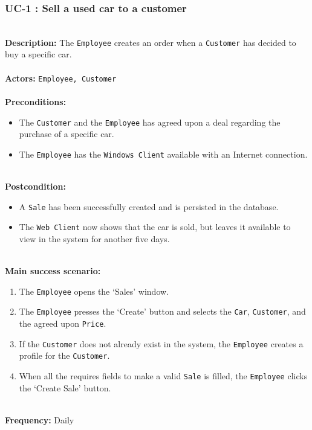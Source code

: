\subsubsection{UC-1 : Sell a used car to a customer}
\label{create-order-use-case}
\HRule \\[0.4cm]
\textbf{Description:} The \texttt{Employee} creates an order when a \texttt{Customer} has decided to buy a specific car. \\
\HRule \\[0.4cm]
\textbf{Actors:} \texttt{Employee, Customer}\\
\HRule \\[0.4cm]
\textbf{Preconditions:} 
\begin{itemize}
    \item The \texttt{Customer} and the \texttt{Employee} has agreed upon a deal regarding the purchase of a specific car.
    \item The \texttt{Employee} has the \texttt{Windows Client} available with an Internet connection.
\end{itemize}
\HRule \\[0.4cm]
\textbf{Postcondition:}
\begin{itemize}
    \item A \texttt{Sale} has been successfully created and is persisted in the database.
    \item The \texttt{Web Client} now shows that the car is sold, but leaves it available to view in the system for another five days.
\end{itemize}
\HRule \\[0.4cm]
\textbf{Main success scenario:}
\begin{enumerate}
    \item The \texttt{Employee} opens the `Sales' window.
    \item The \texttt{Employee} presses the `Create' button and selects the \texttt{Car}, \texttt{Customer}, and the agreed upon \texttt{Price}.
    \item If the \texttt{Customer} does not already exist in the system, the \texttt{Employee} creates a profile for the  \texttt{Customer}.
    \item When all the requires fields to make a valid \texttt{Sale} is filled, the \texttt{Employee} clicks the `Create Sale' button.
\end{enumerate}
\HRule \\[0.4cm]
\textbf{Frequency:}
Daily \\
\HRule \\[0.4cm]

